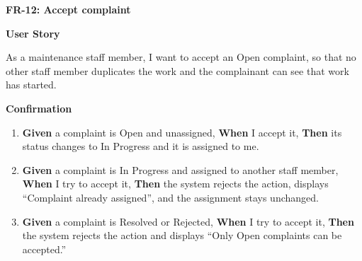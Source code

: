 \noindent\textbf{FR-12: Accept complaint}\par\nopagebreak[4]\smallskip
\noindent\textbf{User Story}\par\nopagebreak[4]
\noindent As a maintenance staff member, I want to accept an Open complaint, so that no other staff member duplicates the work and the complainant can see that work has started.\par\smallskip
{\makeatletter
{}
\makeatother
\noindent\textbf{Confirmation}\par\nopagebreak[4]\vspace{-6pt}\nopagebreak[4]
\begin{enumerate}\setlength{\itemsep}{2pt}\setlength{\parsep}{0pt}\setlength{\topsep}{2pt}\setlength{\partopsep}{0pt}
  \item \textbf{Given} a complaint is Open and unassigned, \textbf{When} I accept it, \textbf{Then} its status changes to In Progress and it is assigned to me.
  \item \textbf{Given} a complaint is In Progress and assigned to another staff member, \textbf{When} I try to accept it, \textbf{Then} the system rejects the action, displays ``Complaint already assigned'', and the assignment stays unchanged.
  \item \textbf{Given} a complaint is Resolved or Rejected, \textbf{When} I try to accept it, \textbf{Then} the system rejects the action and displays ``Only Open complaints can be accepted.''
\end{enumerate}}
\medskip
 
